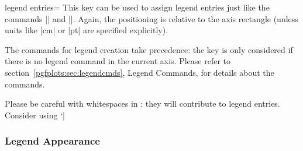 \begin{pgfplotskey}{legend entries=}
	This key can be used to assign legend entries just like the commands |\addlegendentry| and |\legend|. Again, the positioning is relative to the axis rectangle (unless units like |cm| or |pt| are specified explicitly).
\begin{codeexample}[]
\end{codeexample}

	The commands for legend creation take precedence: the key is only considered if there is no legend command in the current axis. Please refer to section~\ref{pgfplots:sec:legendcmds}, Legend Commands, for details about the commands.	
\begin{codeexample}[]
\end{codeexample}
	Please be careful with whitespaces in : they will contribute to legend entries. Consider using `|%
\end{pgfplotskey}


\subsubsection{Legend Appearance}

